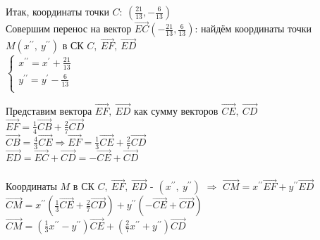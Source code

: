 Итак, координаты точки $C:~(\frac{21}{13}, -\frac{6}{13})$ \\

Совершим перенос на вектор $\overrightarrow{EC}(-\frac{21}{13}, \frac{6}{13})$: найдём координаты точки $M(x^{\prime\prime},~y^{\prime\prime})$ в СК $C,~\overrightarrow{EF},~\overrightarrow{ED}$ \\
	$
		\begin{cases}
			x^{\prime\prime} = x^\prime + \frac{21}{13} \\ 
			y^{\prime\prime} = y^\prime - \frac{6}{13} \\
		\end{cases}
	$

Представим вектора $\overrightarrow{EF},~\overrightarrow{ED}$ как сумму векторов $\overrightarrow{CE},~\overrightarrow{CD}$ \\
	
	$\overrightarrow{EF} = \frac{1}{4} \overrightarrow{CB} + \frac{2}{7} \overrightarrow{CD} $ \\
	$\overrightarrow{CB} = \frac{4}{3} \overrightarrow{CE} \Longrightarrow \overrightarrow{EF} = \frac{1}{3} \overrightarrow{CE} + \frac{2}{7} \overrightarrow{CD}$ \\
	$\overrightarrow{ED} = \overrightarrow{EC} + \overrightarrow{CD} = -\overrightarrow{CE} + \overrightarrow{CD} $ \\
\\
Координаты $M$ в СК $C,~\overrightarrow{EF},~\overrightarrow{ED}$ - $(x^{\prime\prime},~y^{\prime\prime})$ $\Longrightarrow$ $\overrightarrow{CM} = x^{\prime\prime} \overrightarrow{EF} + y^{\prime\prime} \overrightarrow{ED}$ \\
$\overrightarrow{CM} = x^{\prime\prime} (\frac{1}{3} \overrightarrow{CE} + \frac{2}{7} \overrightarrow{CD}) + y^{\prime\prime} (-\overrightarrow{CE} + \overrightarrow{CD})$ \\
$\overrightarrow{CM} = (\frac{1}{3}x^{\prime\prime}  - y^{\prime\prime}) \overrightarrow{CE} + (\frac{2}{7}x^{\prime\prime} + y^{\prime\prime}) \overrightarrow{CD} $ \\


